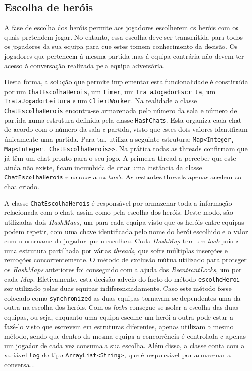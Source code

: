 \documentclass[a4paper]{article}
\begin{document}
\subsection{Escolha de heróis}
\label{sec:3.4}
\hspace{3mm} A fase de escolha dos heróis permite aos jogadores escolherem os heróis com os quais pretendem jogar. No entanto, essa escolha deve ser transmitida para todos os jogadores da sua equipa para que estes tomem conhecimento da decisão. Os jogadores que pertencem à mesma partida mas à equipa contrária não devem ter acesso à conversação realizada pela equipa adversária.

Desta forma, a solução que permite implementar esta funcionalidade é constituída por um \texttt{ChatEscolhaHerois}, um \texttt{Timer}, um \texttt{TrataJogadorEscrita}, um \texttt{TrataJogadorLeitura} e um \texttt{ClientWorker}. Na realidade a classe \texttt{ChatEscolhaHerois} encontra-se armazenada pelo número da sala e número de partida numa estrutura definida pela classe \texttt{HashChats}. Esta organiza cada chat de acordo com o número da sala e partida, visto que estes dois valores identificam únicamente uma partida. Para tal, utiliza a seguinte estrutura: \texttt{Map<Integer, Map<Integer, ChatEscolhaHerois>>}. Na prática todas as threads confirmam que já têm um chat pronto para o seu jogo. A primeira thread a perceber que este ainda não existe, ficam incumbida de criar uma instância da classe \texttt{ChatEscolhaHerois} e coloca-la na \textit{hash}. As restantes threads apenas acedem ao chat criado.

A classe \texttt{ChatEscolhaHerois} é responsável por armazenar toda a informação relacionada com o chat, assim como pela escolha dos heróis. Deste modo, são utilizadas dois \textit{HashMaps}, um para cada equipa visto que os heróis entre equipas podem repetir, com uma chave identificada pelo nome do herói escolhido e o valor com o username do jogador que o escolheu. Cada \textit{HashMap} tem um \textit{lock} pois é uma estrutura partilhada por várias \textit{threads}, que sofre múltiplas inserções e remoções concorrentemente. O método de exclusão mútua utilizado para proteger os \textit{HashMaps} anteriores foi conseguido com a ajuda dos \textit{ReentrantLocks}, um por cada \textit{Map}. Efetivamente, esta decisão adveio do facto do método \texttt{escolheHeroi} ser utilizado pelas duas equipas indiferenciadamente. Caso este método fosse colocado como \texttt{synchronized} as duas equipas tornavam-se dependentes uma da outra na escolha dos heróis. Com os \textit{locks} consegue-se isolar a escolha das duas equipas, ou seja, enquanto uma equipa escolhe um herói a outra pode estar a fazê-lo visto que escrevem em estruturas diferentes, apenas utilizam o mesmo método, sendo que dentro da mesma equipa a concorrência é controlada e apenas um jogador de cada vez consuma a sua escolha. 
Além disso, a classe conta com a variável \texttt{log} do tipo \texttt{ArrayList<String>}, que é responsável por armazenar a conversa...
\end{document}
